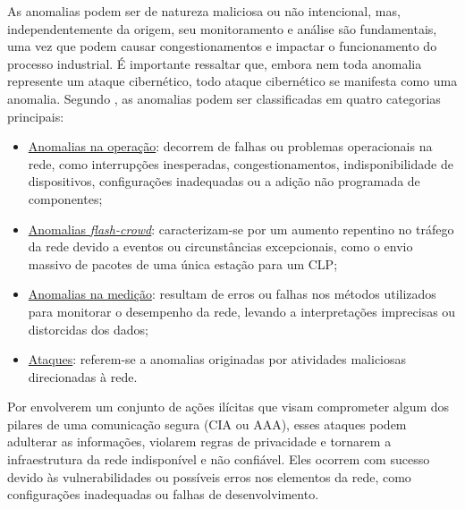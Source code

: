         As anomalias podem ser de natureza maliciosa ou não intencional, mas, independentemente da origem, seu monitoramento e análise são fundamentais, uma vez que podem causar congestionamentos e impactar o funcionamento do processo industrial. É importante ressaltar que, embora nem toda anomalia represente um ataque cibernético, todo ataque cibernético se manifesta como uma anomalia. Segundo , as anomalias podem ser classificadas em quatro categorias principais:
            
        \begin{itemize}
            \item \underline{Anomalias na operação}: decorrem de falhas ou problemas operacionais na rede, como interrupções inesperadas, congestionamentos, indisponibilidade de dispositivos, configurações inadequadas ou a adição não programada de componentes;
            \item \underline{Anomalias \textit{flash-crowd}}: caracterizam-se por um aumento repentino no tráfego da rede devido a eventos ou circunstâncias excepcionais, como o envio massivo de pacotes de uma única estação para um CLP;
            \item \underline{Anomalias na medição}: resultam de erros ou falhas nos métodos utilizados para monitorar o desempenho da rede, levando a interpretações imprecisas ou distorcidas dos dados;
            \item \underline{Ataques}: referem-se a anomalias originadas por atividades maliciosas direcionadas à rede.
        \end{itemize}


        Por envolverem um conjunto de ações ilícitas que visam comprometer algum dos pilares de uma comunicação segura (CIA ou AAA), esses ataques podem adulterar as informações, violarem regras de privacidade e tornarem a infraestrutura da rede indisponível e não confiável. Eles ocorrem com sucesso devido às vulnerabilidades ou possíveis erros nos elementos da rede, como configurações inadequadas ou falhas de desenvolvimento.

